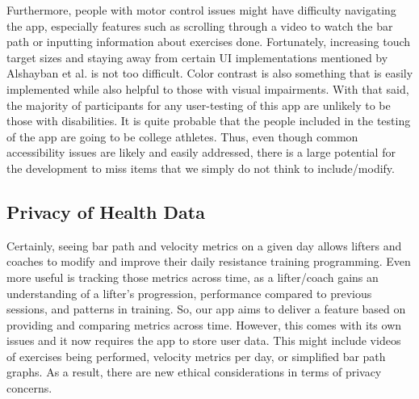 \documentclass[10pt,twocolumn]{article}
\begin{document}
Furthermore, people with motor control issues might have difficulty navigating the app, especially features such as scrolling through a video to watch the bar path or inputting information about exercises done. Fortunately, increasing touch target sizes and staying away from certain UI implementations mentioned by Alshayban et al. is not too difficult. Color contrast is also something that is easily implemented while also helpful to those with visual impairments. With that said, the majority of participants for any user-testing of this app are unlikely to be those with disabilities. It is quite probable that the people included in the testing of the app are going to be college athletes. Thus, even though common accessibility issues are likely and easily addressed, there is a large potential for the development to miss items that we simply do not think to include/modify.

\subsection{Privacy of Health Data}
Certainly, seeing bar path and velocity metrics on a given day allows lifters and coaches to modify and improve their daily resistance training programming. Even more useful is tracking those metrics across time, as a lifter/coach gains an understanding of a lifter's progression, performance compared to previous sessions, and patterns in training. So, our app aims to deliver a feature based on providing and comparing metrics across time. However, this comes with its own issues and it now requires the app to store user data. This might include videos of exercises being performed, velocity metrics per day, or simplified bar path graphs. As a result, there are new ethical considerations in terms of privacy concerns. \par
\end{document}
